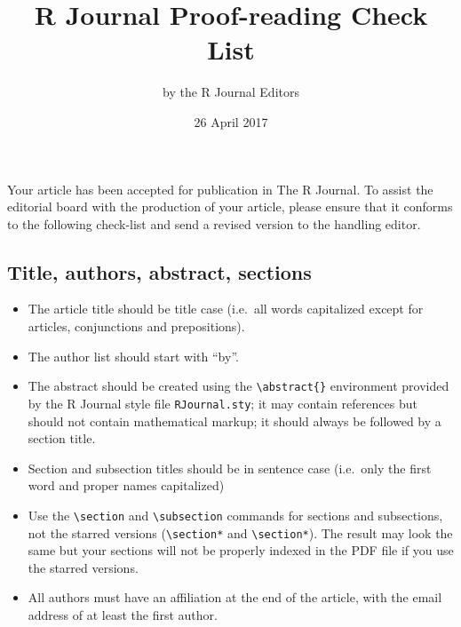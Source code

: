 \documentclass[11pt]{article}
\begin{document}
\title{R Journal Proof-reading Check List}
\author{by the R Journal Editors}
\date{26 April 2017}
\maketitle

Your article has been accepted for publication in The R Journal. To
assist the editorial board with the production of your article, please
ensure that it conforms to the following check-list and send a revised
version to the handling editor.

\subsection*{Title, authors, abstract, sections}
\begin{itemize}
\item The article title should be title case (i.e.\ all words capitalized
   except for articles, conjunctions and prepositions).
\item The author list should start with ``by''.
\item The abstract should be created using the \verb+\abstract{}+
   environment provided by the R Journal style file \texttt{RJournal.sty}; it
   may contain references but should not contain mathematical markup; 
   it should always be followed by a section title.
\item  Section and subsection titles should be in sentence case (i.e.\ only
   the first word and proper names capitalized)
\item Use the \verb+\section+ and \verb+\subsection+ commands for sections and 
      subsections, not the starred versions (\verb+\section*+
      and \verb+\section*+). The result may look the same but your
      sections will not be properly indexed in the PDF file if you use
      the starred versions.
\item All authors must have an affiliation at the end of the article,
      with the email address of at least the first author.
\end{itemize}
\end{document}
